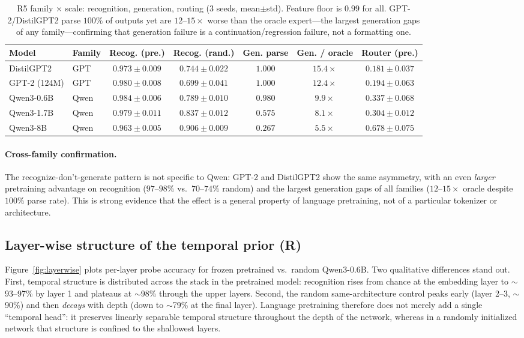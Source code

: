\documentclass{article}
\begin{document}
\begin{table}[t]
\centering
\small
\begin{tabular}{llccccc}
\toprule
Model & Family & Recog. (pre.) & Recog. (rand.) & Gen. parse & Gen. / oracle & Router (pre.) \\
\midrule
DistilGPT2 & GPT & $0.973\pm0.009$ & $0.744\pm0.022$ & $1.000$ & $15.4\times$ & $0.181\pm0.037$ \\
GPT-2 (124M) & GPT & $0.980\pm0.008$ & $0.699\pm0.041$ & $1.000$ & $12.4\times$ & $0.194\pm0.063$ \\
Qwen3-0.6B & Qwen & $0.984\pm0.006$ & $0.789\pm0.010$ & $0.980$ & $9.9\times$ & $0.337\pm0.068$ \\
Qwen3-1.7B & Qwen & $0.979\pm0.011$ & $0.837\pm0.012$ & $0.575$ & $8.1\times$ & $0.304\pm0.012$ \\
Qwen3-8B & Qwen & $0.963\pm0.005$ & $0.906\pm0.009$ & $0.267$ & $5.5\times$ & $0.678\pm0.075$ \\
\bottomrule
\end{tabular}
\caption{R5 family $\times$ scale: recognition, generation, routing (3 seeds,
mean$\pm$std).  Feature floor is $0.99$ for all.  GPT-2/DistilGPT2 parse $100\%$
of outputs yet are $12$--$15\times$ worse than the oracle expert---the largest
generation gaps of any family---confirming that generation failure is a
continuation/regression failure, not a formatting one.}
\label{tab:scale}
\end{table}

\paragraph{Cross-family confirmation.}  The recognize-don't-generate pattern
is not specific to Qwen: GPT-2 and DistilGPT2 show the same asymmetry, with an
even \emph{larger} pretraining advantage on recognition ($97$--$98\%$ vs.\
$70$--$74\%$ random) and the largest generation gaps of all families
($12$--$15\times$ oracle despite $100\%$ parse rate).  This is strong evidence
that the effect is a general property of language pretraining, not of a
particular tokenizer or architecture.

\subsection{Layer-wise structure of the temporal prior (R)}
\label{sec:layerwise}
Figure~\ref{fig:layerwise} plots per-layer probe accuracy for frozen
pretrained vs.\ random Qwen3-0.6B.  Two qualitative differences stand out.
First, temporal structure is distributed across the stack in the pretrained
model: recognition rises from chance at the embedding layer to $\sim$93--97\%
by layer 1 and plateaus at $\sim$98\% through the upper layers.  Second, the
random same-architecture control peaks early (layer 2--3, $\sim$90\%) and then
\emph{decays} with depth (down to $\sim$79\% at the final layer).  Language
pretraining therefore does not merely add a single ``temporal head'': it
preserves linearly separable temporal structure throughout the depth of the
network, whereas in a randomly initialized network that structure is confined
to the shallowest layers.
\end{document}
